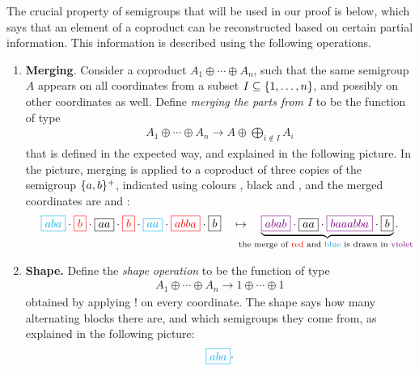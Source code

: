 
The crucial property of semigroups that will be used in our proof is  below, which says that an element of a coproduct can be reconstructed based on certain partial information. This information is described  using the following operations.

\begin{enumerate}
    \item \textbf{Merging}. Consider a coproduct $A_1 \oplus \cdots \oplus A_n$, such that the same semigroup $A$ appears on all coordinates from a subset $I \subseteq \{1,\ldots,n\}$, and possibly on other coordinates as well. Define \emph{merging the parts from $I$} to be the function of type 
    \begin{align*}
        A_1 \oplus \cdots \oplus A_n \to  A \oplus \bigoplus_{i \not \in I} A_i
        \end{align*}
    that is defined in the expected way, and explained in the following picture. In the picture, merging is applied to  a coproduct of three copies of the semigroup $\{a,b\}^+$, indicated using colours , black and , and the merged coordinates are  and :
        \begin{align*}
        \blue{\boxed{aba}} \cdot 
        \red{\boxed{b}} \cdot 
        \boxed{aa} \cdot 
        \red{\boxed{b}} \cdot 
        \blue{\boxed{aa}} \cdot 
        \red{\boxed{abba}} \cdot 
        \boxed{b}
        \quad \mapsto \quad  
        \myunderbrace{
            \violet{\boxed{abab}} \cdot 
        \boxed{aa} \cdot 
        \violet{\boxed{baaabba}} \cdot 
        \boxed{b}
        }{the merge of \red{red} and \blue{blue} is drawn in \violet{violet}}.\end{align*}    
        \item \textbf {Shape.}  Define the \emph{shape operation} to be the function of type 
        \begin{align*}
        A_1 \oplus \cdots \oplus A_n \to 1 \oplus \cdots \oplus 1
        \end{align*}
        obtained by applying $!$ on every coordinate. The shape says how many alternating blocks there are, and which semigroups they come from, as explained in the following picture:
        \begin{align*}
            \blue{\boxed{aba}} \cdot 

\end{align*}
\end{enumerate}

